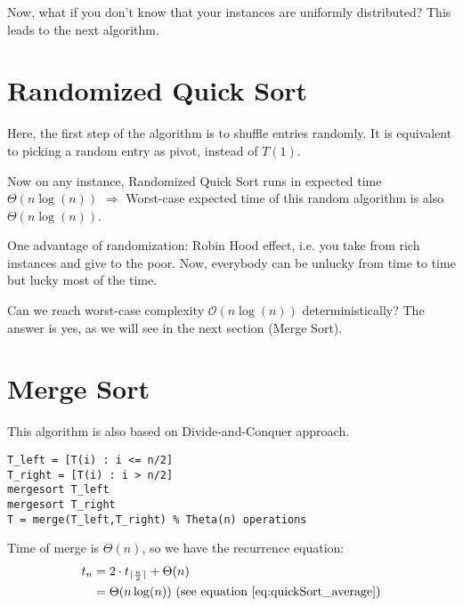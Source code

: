 Now, what if you don't know that your instances are uniformly distributed? This leads to the next algorithm.

\section{Randomized Quick Sort}
Here, the first step of the algorithm is to shuffle entries randomly. It is equivalent to picking a random entry as pivot, instead of $T(1)$.

Now on any instance, Randomized Quick Sort runs in expected time $\Theta(n \log(n))$ $\Rightarrow$ Worst-case expected time of this random algorithm is also $\Theta(n \log(n))$. 

One advantage of randomization: Robin Hood effect, i.e. you take from rich instances and give to the poor. Now, everybody can be unlucky from time to time but lucky most of the time. 

Can we reach worst-case complexity $\mathcal{O}(n \log(n))$ deterministically? 
\newline The answer is yes, as we will see in the next section (Merge Sort). 

\section{Merge Sort}

This algorithm is also based on Divide-and-Conquer approach. 

\begin{lstlisting}[label={list:c1:merge},caption=Pseudo-code of the merge sort algorithm]
T_left = [T(i) : i <= n/2]
T_right = [T(i) : i > n/2]
mergesort T_left
mergesort T_right
T = merge(T_left,T_right) % Theta(n) operations
\end{lstlisting}

Time of merge is $\Theta(n)$, so we have the recurrence equation: 
\begin{align*}
t_n & = 2 \cdot t_{\lceil \frac{n}{2}\rceil}+ \Theta(n) \\
& = \Theta(n \log(n))  \text{ (see equation~\eqref{eq:quickSort_average})}
\end{align*}

